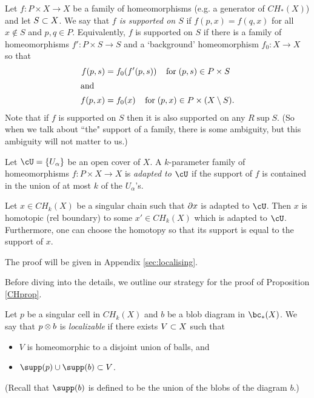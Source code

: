 Let $f: P \times X \to X$ be a family of homeomorphisms (e.g. a generator of $CH_*(X)$)
and let $S \subset X$.
We say that {\it $f$ is supported on $S$} if $f(p, x) = f(q, x)$ for all
$x \notin S$ and $p, q \in P$. Equivalently, $f$ is supported on $S$ if there is a family of homeomorphisms $f' : P \times S \to S$ and a `background'
homeomorphism $f_0 : X \to X$ so that
\begin{align*}
	f(p,s) & = f_0(f'(p,s)) \;\;\;\; \mbox{for}\; (p, s) \in P\times S \\
\intertext{and}
	f(p,x) & = f_0(x) \;\;\;\; \mbox{for}\; (p, x) \in {P \times (X \setminus S)}.
\end{align*}
Note that if $f$ is supported on $S$ then it is also supported on any $R \sup S$.
(So when we talk about ``the" support of a family, there is some ambiguity,
but this ambiguity will not matter to us.)

Let $\cU = \{U_\alpha\}$ be an open cover of $X$.
A $k$-parameter family of homeomorphisms $f: P \times X \to X$ is
{\it adapted to $\cU$} 
if the support of $f$ is contained in the union
of at most $k$ of the $U_\alpha$'s.

\begin{lemma}  \label{extension_lemma}
Let $x \in CH_k(X)$ be a singular chain such that $\partial x$ is adapted to $\cU$.
Then $x$ is homotopic (rel boundary) to some $x' \in CH_k(X)$ which is adapted to $\cU$.
Furthermore, one can choose the homotopy so that its support is equal to the support of $x$.
\end{lemma}

The proof will be given in Appendix \ref{sec:localising}.

\medskip

Before diving into the details, we outline our strategy for the proof of Proposition \ref{CHprop}.

Let $p$ be a singular cell in $CH_k(X)$ and $b$ be a blob diagram in $\bc_*(X)$.
We say that $p\otimes b$ is {\it localizable} if there exists $V \subset X$ such that
\begin{itemize}
\item $V$ is homeomorphic to a disjoint union of balls, and
\item $\supp(p) \cup \supp(b) \sub V$.
\end{itemize}
(Recall that $\supp(b)$ is defined to be the union of the blobs of the diagram $b$.)

